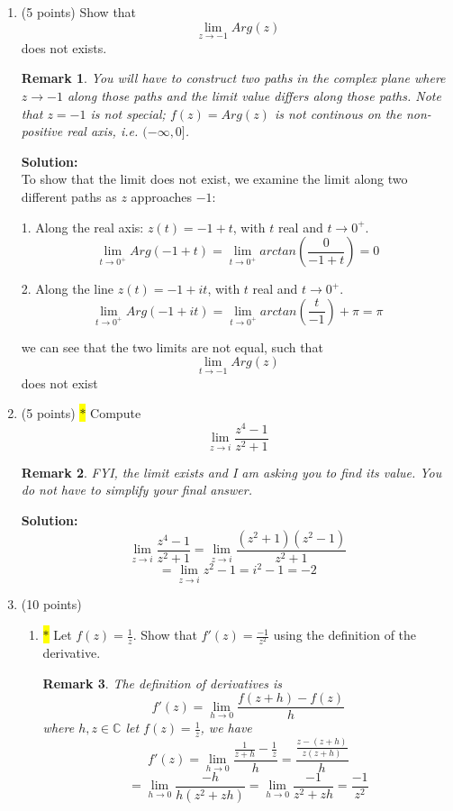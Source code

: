 \documentclass[12pt]{article}
\newtheorem*{remark}{Remark}
\begin{document}
\begin{enumerate}


\item (5 points)  Show that 
\[
\lim_{z \rightarrow -1} Arg(z)  
\]
does not exists.  

\begin{remark}
You will have to construct two paths in the complex plane where $z \rightarrow -1$ along those paths and the limit value differs along those paths.  Note that $z=-1$ is not special; $f(z) = Arg(z)$ is not continous on the non-positive real axis, i.e. $(-\infty, 0]$.  
\end{remark}

\textbf{Solution:}\\
To show that the limit does not exist, we examine the limit along two different paths as \(z\) approaches \(-1\):

1. Along the real axis: \(z(t) = -1 + t\), with \(t\) real and \(t \to 0^+\).
   \[ \lim_{t \to 0^+} Arg(-1 + t) = \lim_{t \to 0^+} arctan(\frac{0}{-1+t}) = 0 \]

2. Along the line \(z(t) = -1 + it\), with \(t\) real and \(t \to 0^+\).
   \[ \lim_{t \to 0^+} Arg(-1 + it) = \lim_{t \to 0^+} arctan(\frac{t}{-1})+\pi=\pi \]

we can see that the two limits are not equal, such that \[\lim_{t \to -1} Arg(z)\] does not exist


\item (5 points) \colorbox{yellow}{$\ast$} Compute
\[
\lim_{z \rightarrow i}\frac{ z^{4} - 1}{z^{2} + 1} 
\]
\begin{remark}
FYI, the limit exists and I am asking you to find its value.   You do not have to simplify your final answer.
\end{remark}
\textbf{Solution:}\\
\[
\lim_{z\to i} \frac{ z^{4} - 1}{z^{2} + 1} = \lim_{z\to i} \frac{(z^2+1)(z^2-1)}{z^2+1}
\]
\[
=\lim_{z\to i} z^2-1=i^2-1=-2
\]


\item (10 points) 
\begin{enumerate}
    \item \colorbox{yellow}{$\ast$} Let $f(z) = \frac{1}{z}$.  Show that $f'(z) = \frac{-1}{z^{2}}$ using the definition of the derivative.  
\begin{remark}
    The definition of derivatives is\[
    f'(z)=\lim_{h\to 0} \frac{f(z+h)-f(z)}{h}
    \]
    where $ {h,z \in \mathbb{C}} $
    let $f(z)=\frac{1}{z}$, we have
    \[
    f'(z)=\lim_{h\to 0}\frac{\frac{1}{z+h}-\frac{1}{z}}{h}=\frac{\frac{z-(z+h)}{z(z+h)}}{h}
    \]
    \[
    =\lim_{h\to 0}\frac{-h}{h(z^2+zh)}=\lim_{h\to 0}\frac{-1}{z^2+zh}=\frac{-1}{z^2}
    \]
    

\end{remark}
\end{enumerate}
\end{enumerate}
\end{document}
